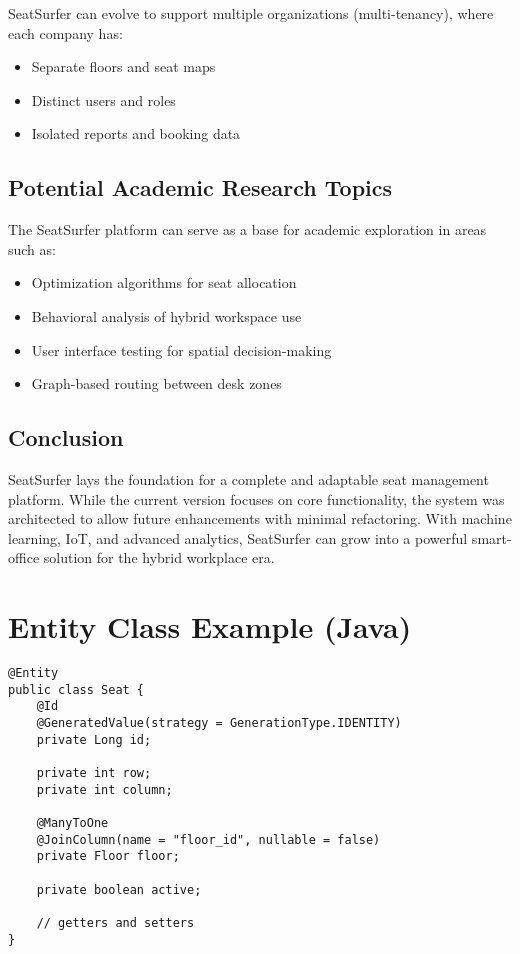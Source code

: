 \documentclass[12pt,a4paper]{report}
\begin{document}
SeatSurfer can evolve to support multiple organizations (multi-tenancy), where each company has:
\begin{itemize}
    \item Separate floors and seat maps
    \item Distinct users and roles
    \item Isolated reports and booking data
\end{itemize}

\section{Potential Academic Research Topics}

The SeatSurfer platform can serve as a base for academic exploration in areas such as:
\begin{itemize}
    \item Optimization algorithms for seat allocation
    \item Behavioral analysis of hybrid workspace use
    \item User interface testing for spatial decision-making
    \item Graph-based routing between desk zones
\end{itemize}

\section{Conclusion}

SeatSurfer lays the foundation for a complete and adaptable seat management platform. While the current version focuses on core functionality, the system was architected to allow future enhancements with minimal refactoring. With machine learning, IoT, and advanced analytics, SeatSurfer can grow into a powerful smart-office solution for the hybrid workplace era.

\newpage

\appendix

\chapter{Entity Class Example (Java)}
\label{appendix:entity}

\begin{lstlisting}[caption=Seat Entity (Java), label=lst:seat-entity]
@Entity
public class Seat {
    @Id
    @GeneratedValue(strategy = GenerationType.IDENTITY)
    private Long id;

    private int row;
    private int column;

    @ManyToOne
    @JoinColumn(name = "floor_id", nullable = false)
    private Floor floor;

    private boolean active;

    // getters and setters
}
\end{lstlisting}
\end{document}

